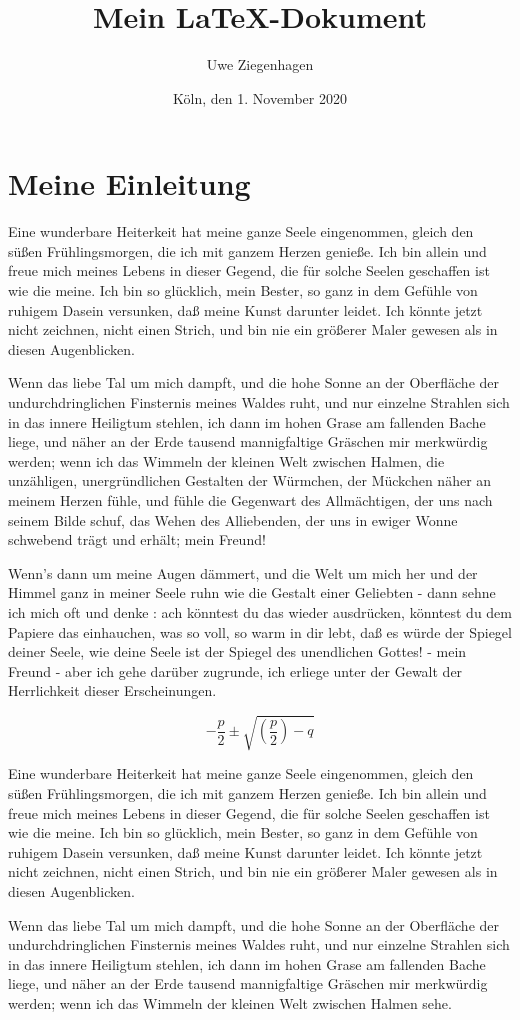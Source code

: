 \documentclass[12pt,ngerman,parskip=half]{scrartcl}
\title{Mein \LaTeX-Dokument}
\author{Uwe Ziegenhagen}
\date{Köln, den 1. November 2020}
\begin{document}
\maketitle

\tableofcontents

\section{Meine Einleitung}

Eine wunderbare Heiterkeit hat meine ganze Seele eingenommen, gleich den süßen Frühlingsmorgen, die ich mit ganzem Herzen genieße. Ich bin allein und freue mich meines Lebens in dieser Gegend, die für solche Seelen geschaffen ist wie die meine. Ich bin so glücklich, mein Bester, so ganz in dem Gefühle von ruhigem Dasein versunken, daß meine Kunst darunter leidet. Ich könnte jetzt nicht zeichnen, nicht einen Strich, und bin nie ein größerer Maler gewesen als in diesen Augenblicken. 

Wenn das liebe Tal um mich dampft, und die hohe Sonne an der Oberfläche der undurchdringlichen Finsternis meines Waldes ruht, und nur einzelne Strahlen sich in das innere Heiligtum stehlen, ich dann im hohen Grase am fallenden Bache liege, und näher an der Erde tausend mannigfaltige Gräschen mir merkwürdig werden; wenn ich das Wimmeln der kleinen Welt zwischen Halmen, die unzähligen, unergründlichen Gestalten der Würmchen, der Mückchen näher an meinem Herzen fühle, und fühle die Gegenwart des Allmächtigen, der uns nach seinem Bilde schuf, das Wehen des Alliebenden, der uns in ewiger Wonne schwebend trägt und erhält; mein Freund! 

Wenn's dann um meine Augen dämmert, und die Welt um mich her und der Himmel ganz in meiner Seele ruhn wie die Gestalt einer Geliebten - dann sehne ich mich oft und denke : ach könntest du das wieder ausdrücken, könntest du dem Papiere das einhauchen, was so voll, so warm in dir lebt, daß es würde der Spiegel deiner Seele, wie deine Seele ist der Spiegel des unendlichen Gottes! - mein Freund - aber ich gehe darüber zugrunde, ich erliege unter der Gewalt der Herrlichkeit dieser Erscheinungen. 

\begin{equation}
-\frac{p}{2} \pm \sqrt{ \left(\frac{p}{2}\right) - q  }
\end{equation}

Eine wunderbare Heiterkeit hat meine ganze Seele eingenommen, gleich den süßen Frühlingsmorgen, die ich mit ganzem Herzen genieße. Ich bin allein und freue mich meines Lebens in dieser Gegend, die für solche Seelen geschaffen ist wie die meine. Ich bin so glücklich, mein Bester, so ganz in dem Gefühle von ruhigem Dasein versunken, daß meine Kunst darunter leidet. Ich könnte jetzt nicht zeichnen, nicht einen Strich, und bin nie ein größerer Maler gewesen als in diesen Augenblicken. 

Wenn das liebe Tal um mich dampft, und die hohe Sonne an der Oberfläche der undurchdringlichen Finsternis meines Waldes ruht, und nur einzelne Strahlen sich in das innere Heiligtum stehlen, ich dann im hohen Grase am fallenden Bache liege, und näher an der Erde tausend mannigfaltige Gräschen mir merkwürdig werden; wenn ich das Wimmeln der kleinen Welt zwischen Halmen sehe.
\end{document}
